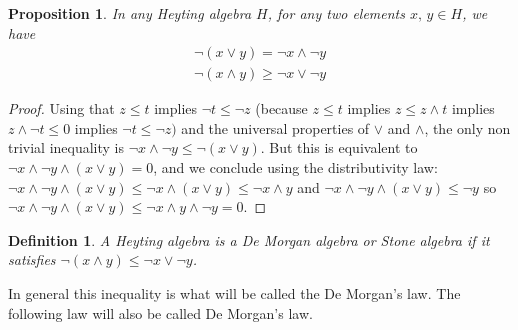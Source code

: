 \documentclass{article}
\newtheorem{definition}[theorem]{Definition}
\newtheorem{proposition}[theorem]{Proposition}
\begin{document}
\begin{proposition}\label{true_dml}
    In any Heyting algebra $H$, for any two elements $x,\,y\in H$, we have
    \begin{align}
        \neg (x\lor y) = \neg x\land \neg y\\
        \neg (x\land y) \geq \neg x\lor \neg y
    \end{align}
    
\end{proposition}
\begin{proof}
    Using that $z\leq t$ implies $\neg t\leq \neg z$ (because $z\leq t$ implies $z\leq z\land t$ implies $z\land \neg t\leq 0$ implies $\neg t\leq \neg z)$ and the universal properties of $\lor$ and $\land$, the only non trivial inequality is $\neg x\land \neg y\leq \neg (x\lor y)$. But this is equivalent to $\neg x\land \neg y \land (x\lor y)=0$, and we conclude using the distributivity law:
    $\neg x\land \neg y \land (x\lor y)\leq \neg x\land (x\lor y)\leq \neg x\land y$ and $\neg x\land \neg y \land (x\lor y)\leq \neg y$ so $\neg x\land \neg y \land (x\lor y)\leq \neg x\land y \land \neg y=0$. 
\end{proof}

\begin{definition}
    A Heyting algebra is a De Morgan algebra or Stone algebra if it satisfies $\neg (x\land y) \leq \neg x\lor \neg y$. 
\end{definition}
In general this inequality is what will be called the De Morgan's law. The following law will also be called De Morgan's law.
\end{document}
